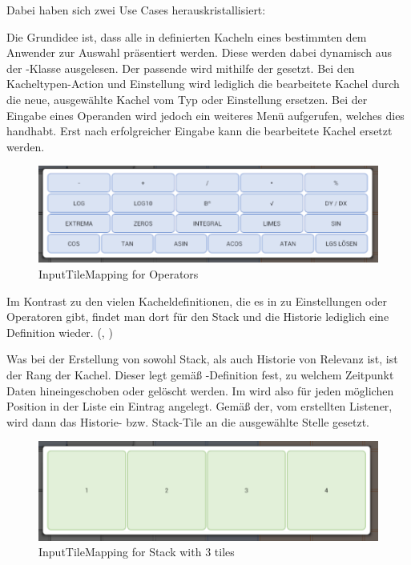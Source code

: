 Dabei haben sich zwei Use Cases herauskristallisiert:

Die Grundidee ist, dass alle in  definierten Kacheln eines bestimmten  dem Anwender zur Auswahl präsentiert werden. Diese werden dabei dynamisch aus der -Klasse ausgelesen. Der passende  wird mithilfe der  gesetzt. Bei den Kacheltypen-Action und Einstellung wird lediglich die bearbeitete Kachel durch die neue, ausgewählte Kachel vom Typ  oder Einstellung ersetzen. Bei der Eingabe eines Operanden wird jedoch ein weiteres Menü aufgerufen, welches dies handhabt. Erst nach erfolgreicher Eingabe kann die bearbeitete Kachel ersetzt werden.

\begin{figure}[h]
	\includegraphics[width=\columnwidth]{img/inputtilemapping-for-operators}
	\caption[InputTileMapping for Operators]{InputTileMapping for Operators\footnotemark}
\end{figure}

Im Kontrast zu den vielen Kacheldefinitionen, die es in  zu Einstellungen oder Operatoren gibt, findet man dort für den Stack und die Historie lediglich eine Definition wieder. (, )

Was bei der Erstellung von sowohl Stack, als auch Historie von Relevanz ist, ist der Rang der Kachel. Dieser legt gemäß -Definition fest, zu welchem Zeitpunkt Daten hineingeschoben oder gelöscht werden. Im  wird also für jeden möglichen Position in der Liste ein Eintrag angelegt. Gemäß der, vom  erstellten Listener, wird dann das Historie- bzw. Stack-Tile an die ausgewählte Stelle gesetzt.

\begin{figure}[h]
	\includegraphics[width=0.7\columnwidth]{img/inputtilemapping-for-stack-with-3-tiles}
	\caption[InputTileMapping for Stack with 3 tiles]{InputTileMapping for Stack with 3 tiles\footnotemark}
\end{figure}
\FloatBarrier

